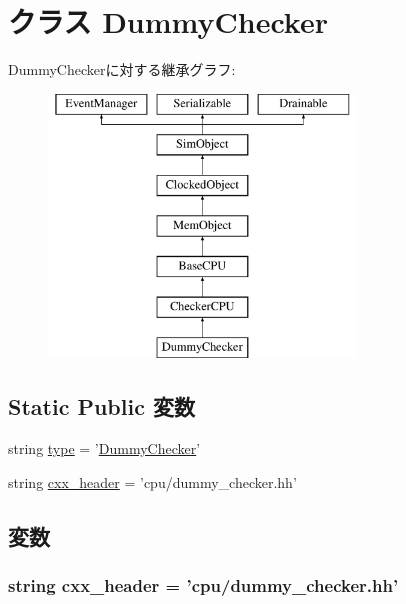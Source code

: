 \hypertarget{classDummyChecker_1_1DummyChecker}{
\section{クラス DummyChecker}
\label{classDummyChecker_1_1DummyChecker}
}
DummyCheckerに対する継承グラフ:\begin{figure}[H]
\begin{center}
\leavevmode
\includegraphics[height=7cm]{classDummyChecker_1_1DummyChecker}
\end{center}
\end{figure}
\subsection*{Static Public 変数}
\begin{DoxyCompactItemize}
\item 
string \hyperlink{classDummyChecker_1_1DummyChecker_acce15679d830831b0bbe8ebc2a60b2ca}{type} = '\hyperlink{classDummyChecker_1_1DummyChecker}{DummyChecker}'
\item 
string \hyperlink{classDummyChecker_1_1DummyChecker_a17da7064bc5c518791f0c891eff05fda}{cxx\_\-header} = 'cpu/dummy\_\-checker.hh'
\end{DoxyCompactItemize}


\subsection{変数}
\hypertarget{classDummyChecker_1_1DummyChecker_a17da7064bc5c518791f0c891eff05fda}{
\subsubsection[{cxx\_\-header}]{\setlength{\rightskip}{0pt plus 5cm}string {\bf cxx\_\-header} = 'cpu/dummy\_\-checker.hh'}}
\label{classDummyChecker_1_1DummyChecker_a17da7064bc5c518791f0c891eff05fda}


